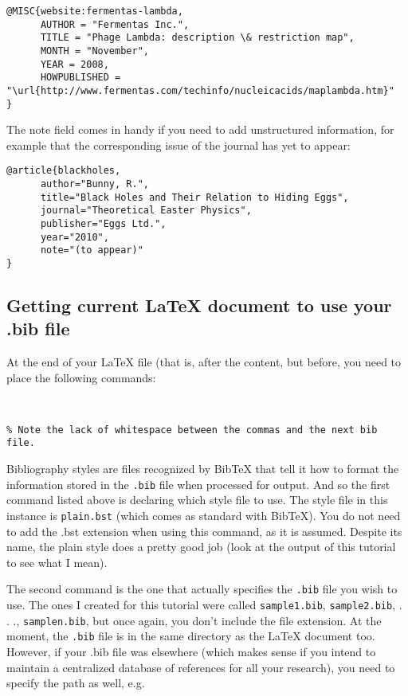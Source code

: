\begin{lstlisting}
@MISC{website:fermentas-lambda,
      AUTHOR = "Fermentas Inc.",
      TITLE = "Phage Lambda: description \& restriction map",
      MONTH = "November",
      YEAR = 2008,
      HOWPUBLISHED = "\url{http://www.fermentas.com/techinfo/nucleicacids/maplambda.htm}"
}
\end{lstlisting}
The note field comes in handy if you need to add unstructured information, for
example that the corresponding issue of the journal has yet to appear:

\begin{lstlisting}
@article{blackholes,
      author="Bunny, R.",
      title="Black Holes and Their Relation to Hiding Eggs",
      journal="Theoretical Easter Physics",
      publisher="Eggs Ltd.",
      year="2010",
      note="(to appear)"
}
\end{lstlisting}

\subsection{Getting current LaTeX document to use your .bib file}
At the end of your LaTeX file (that is, after the content, but
before\verb||, you need to place the following commands:

\begin{lstlisting}

 
% Note the lack of whitespace between the commas and the next bib file.
\end{lstlisting}
Bibliography styles are files recognized by BibTeX that tell it how to format
the information stored in the \verb|.bib| file when processed for output. And
so the first command listed above is declaring which style file to use. The
style file in this instance is \verb|plain.bst| (which comes as standard with
BibTeX). You do not need to add the .bst extension when using this command, as
it is assumed. Despite its name, the plain style does a pretty good job (look
at the output of this tutorial to see what I mean).

The second command is the one that actually specifies the \verb|.bib| file
you wish to use. The ones I created for this tutorial were called
\verb|sample1.bib|, \verb|sample2.bib|, . . ., \verb|samplen.bib|, but
once again, you don't include the file extension. At the moment, the
\verb|.bib| file is in the same directory as the LaTeX document too. However,
if your .bib file was elsewhere (which makes sense if you intend to maintain a
centralized database of references for all your research), you need to specify
the path as well, e.g\verb||.

